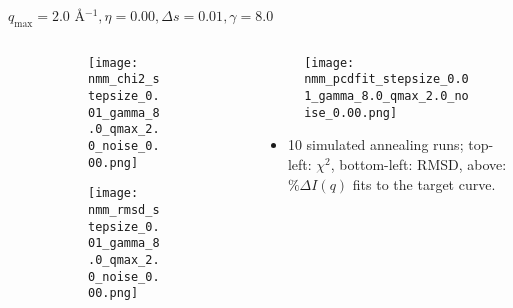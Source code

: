 \documentclass{beamer}
\begin{document}
\begin{frame}{$ q_{\textrm{max}}=2.0 $ \AA $^{-1}, \eta=0.00, \Delta s=0.01, \gamma=8.0$}
	\begin{columns}
		\begin{column}{.5\textwidth}
			\begin{figure}[H]
			\centering
			\begin{subfigure}[b]{\textwidth}
				\centering
				\texttt{[image: nmm\_chi2\_stepsize\_0.01\_gamma\_8.0\_qmax\_2.0\_noise\_0.00.png]}
				\label{fig:}
			\end{subfigure}
			\begin{subfigure}[b]{\textwidth}
				\centering
				\texttt{[image: nmm\_rmsd\_stepsize\_0.01\_gamma\_8.0\_qmax\_2.0\_noise\_0.00.png]}
				\label{fig:}
			\end{subfigure}
			\end{figure}
		\end{column}
		\begin{column}{.5\textwidth}
			\begin{figure}[H]
				\centering
				\texttt{[image: nmm\_pcdfit\_stepsize\_0.01\_gamma\_8.0\_qmax\_2.0\_noise\_0.00.png]}
				\label{fig:}
			\end{figure}
			\begin{itemize}
				\item 10 simulated annealing runs; top-left: $\chi^2$, bottom-left: RMSD, above: $\%\Delta I(q)$ fits to the target curve.
			\end{itemize}
		\end{column}
	\end{columns}
\end{frame}
 
\end{document}
